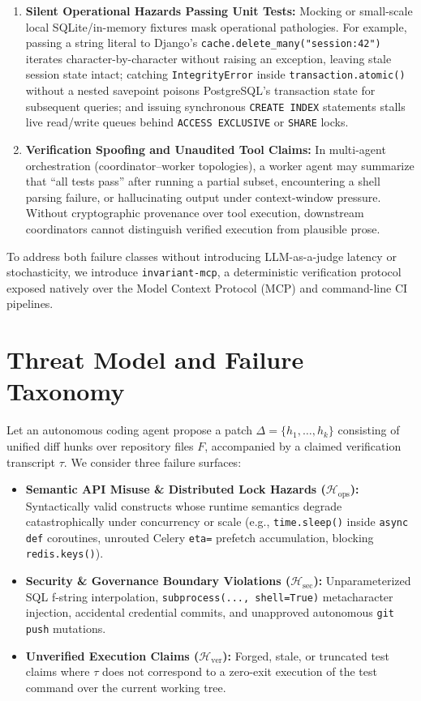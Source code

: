 \documentclass[11pt,a4paper]{article}
\begin{document}
\begin{enumerate}
    \item \textbf{Silent Operational Hazards Passing Unit Tests:} Mocking or small-scale local SQLite/in-memory fixtures mask operational pathologies. For example, passing a string literal to Django's \texttt{cache.delete\_many("session:42")} iterates character-by-character without raising an exception, leaving stale session state intact; catching \texttt{IntegrityError} inside \texttt{transaction.atomic()} without a nested savepoint poisons PostgreSQL's transaction state for subsequent queries; and issuing synchronous \texttt{CREATE INDEX} statements stalls live read/write queues behind \texttt{ACCESS EXCLUSIVE} or \texttt{SHARE} locks.
    \item \textbf{Verification Spoofing and Unaudited Tool Claims:} In multi-agent orchestration (coordinator--worker topologies), a worker agent may summarize that ``all tests pass'' after running a partial subset, encountering a shell parsing failure, or hallucinating output under context-window pressure. Without cryptographic provenance over tool execution, downstream coordinators cannot distinguish verified execution from plausible prose.
\end{enumerate}

To address both failure classes without introducing LLM-as-a-judge latency or stochasticity, we introduce \texttt{invariant-mcp}, a deterministic verification protocol exposed natively over the Model Context Protocol (MCP) and command-line CI pipelines.

\section{Threat Model and Failure Taxonomy}
Let an autonomous coding agent propose a patch $\Delta = \{h_1, \dots, h_k\}$ consisting of unified diff hunks over repository files $F$, accompanied by a claimed verification transcript $\tau$. We consider three failure surfaces:

\begin{itemize}
    \item \textbf{Semantic API Misuse \& Distributed Lock Hazards ($\mathcal{H}_{\text{ops}}$):} Syntactically valid constructs whose runtime semantics degrade catastrophically under concurrency or scale (e.g., \texttt{time.sleep()} inside \texttt{async def} coroutines, unrouted Celery \texttt{eta=} prefetch accumulation, blocking \texttt{redis.keys()}).
    \item \textbf{Security \& Governance Boundary Violations ($\mathcal{H}_{\text{sec}}$):} Unparameterized SQL f-string interpolation, \texttt{subprocess(..., shell=True)} metacharacter injection, accidental credential commits, and unapproved autonomous \texttt{git push} mutations.
    \item \textbf{Unverified Execution Claims ($\mathcal{H}_{\text{ver}}$):} Forged, stale, or truncated test claims where $\tau$ does not correspond to a zero-exit execution of the test command over the current working tree.
\end{itemize}
\end{document}
